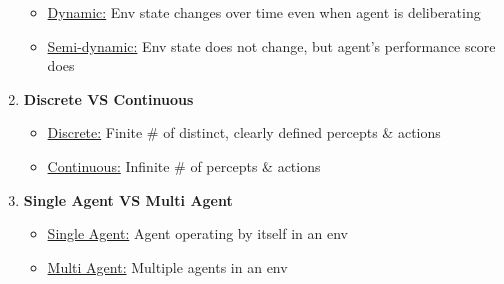 \documentclass[landscape]{article}
\begin{document}
\begin{multicols*}{5}
\begin{enumerate}
\begin{itemize}
        \item \underline{Dynamic:} Env state changes over time even when agent is deliberating
        \item \underline{Semi-dynamic:} Env state does not change, but agent's performance score does
      \end{itemize}
      \item \textbf{Discrete VS Continuous}
      \begin{itemize}
        \item \underline{Discrete:} Finite \# of distinct, clearly defined percepts \& actions
        \item \underline{Continuous:} Infinite \# of percepts \& actions
      \end{itemize}
      \item \textbf{Single Agent VS Multi Agent}
      \begin{itemize}
        \item \underline{Single Agent:} Agent operating by itself in an env
        \item \underline{Multi Agent:} Multiple agents in an env
      \end{itemize}
    \end{enumerate}


\end{multicols*}
\end{document}
